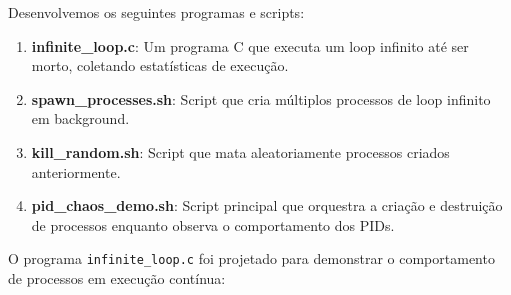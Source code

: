 \documentclass[a4paper,11pt]{article}
\begin{document}
Desenvolvemos os seguintes programas e scripts:

\begin{enumerate}
    \item \textbf{infinite\_loop.c}: Um programa C que executa um loop infinito até ser morto, coletando estatísticas de execução.
    \item \textbf{spawn\_processes.sh}: Script que cria múltiplos processos de loop infinito em background.
    \item \textbf{kill\_random.sh}: Script que mata aleatoriamente processos criados anteriormente.
    \item \textbf{pid\_chaos\_demo.sh}: Script principal que orquestra a criação e destruição de processos enquanto observa o comportamento dos PIDs.
\end{enumerate}

O programa \texttt{infinite\_loop.c} foi projetado para demonstrar o comportamento de processos em execução contínua:
\end{document}
